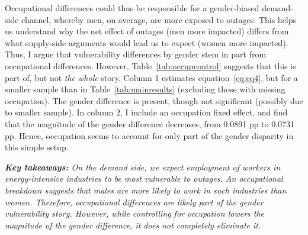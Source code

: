 \documentclass[12pt]{article}
\begin{document}
\par
Occupational differences could thus be responsible for a gender-biased demand-side channel, whereby men, on average, are more exposed to outages. This helps us understand why the net effect of outages (men more impacted) differs from what supply-side arguments would lead us to expect (women more impacted). Thus, I argue that vulnerability differences by gender stem in part from occupational differences. However, Table~\ref{tab:occupcontrol} suggests that this is part of, but not \textit{the whole} story. Column 1 estimates equation~\ref{eq:eq4}, but for a smaller sample than in Table~\ref{tab:mainresults} (excluding those with missing occupation). The gender difference is present, though not significant (possibly due to smaller sample). In column 2, I include an occupation fixed effect, and find that the magnitude of the gender difference decreases, from 0.0891 pp to 0.0731 pp. Hence, occupation seems to account for only part of the gender disparity in this simple setup.
\par \noindent 
\textit{\textbf{Key takeaways:} On the demand side, we expect employment of workers in energy-intensive industries to be most vulnerable to outages. An occupational breakdown suggests that males are more likely to work in such industries than women. Therefore, occupational differences are likely part of the gender vulnerability story. However, while controlling for occupation lowers the magnitude of the gender difference, it does not completely eliminate it.}
\end{document}
